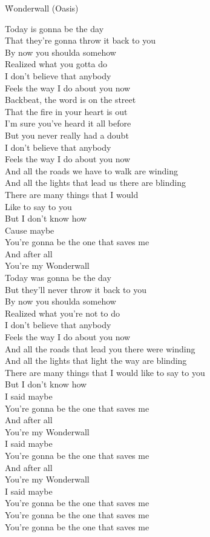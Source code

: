 \documentclass{novel}
\begin{document}
\newpage
\small
\h*{Wonderwall (Oasis)}

Today is gonna be the day \\
That they're gonna throw it back to you \\
By now you shoulda somehow \\
Realized what you gotta do \\
I don't believe that anybody \\
Feels the way I do about you now \\
Backbeat, the word is on the street \\
That the fire in your heart is out \\
I'm sure you've heard it all before \\
But you never really had a doubt \\
I don't believe that anybody \\
Feels the way I do about you now \\
And all the roads we have to walk are winding \\
And all the lights that lead us there are blinding \\
There are many things that I would \\
Like to say to you \\
But I don't know how \\
Cause maybe \\
You're gonna be the one that saves me \\
And after all \\
You're my Wonderwall \\
Today was gonna be the day \\
But they'll never throw it back to you \\
By now you shoulda somehow \\
Realized what you're not to do \\
I don't believe that anybody \\
Feels the way I do about you now \\
And all the roads that lead you there were winding \\
And all the lights that light the way are blinding \\
There are many things that I would like to say to you \\
But I don't know how \\
I said maybe \\
You're gonna be the one that saves me \\
And after all \\
You're my Wonderwall \\
I said maybe \\
You're gonna be the one that saves me \\
And after all \\
You're my Wonderwall \\
I said maybe \\
You're gonna be the one that saves me \\
You're gonna be the one that saves me \\
You're gonna be the one that saves me
\end{document}
